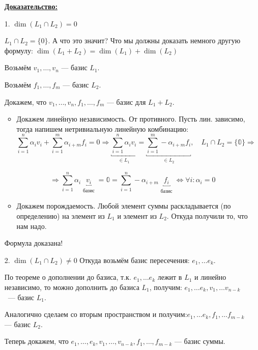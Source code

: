 \begin{enumerate}
    \item[]  \textbf{\uline{Доказательство:}}
    \item[1.] \(\dim (L_1 \cap L_2) = 0\)

          \(L_1 \cap L_2 = \{0\}\). А что это значит? Что мы должны доказать немного другую формулу: \(\dim (L_1 + L_2) = \dim (L_1) + \dim (L_2)\)

          Возьмём $v_1,\ldots, v_n$ ---   базис $L_1$.

          Возьмём $f_1,\ldots, f_m$ ---  базис $L_2$.

          Докажем, что $v_1,\ldots,v_n,f_1,\ldots,f_m$ --- базис для $L_1+ L_2$.


          \begin{itemize}
              \item Докажем линейную независимость. От противного. Пусть лин. зависимо, тогда напишем нетривиальную линейную комбинацию:
                    $$\sum\limits_{i=1}^n \alpha_i v_i + \sum\limits_{i=1}^m \alpha_{i+m} f_i =0 \Rightarrow \underbracket{{\sum\limits_{i=1}^n\alpha_iv_i}}_{\substack{\in L_1}} = \underbracket{{{\sum\limits_{i=1}^m} -\alpha_{i+m}f_i}}_{\substack{\in L_2}}, \quad L_1 \cap L_2 = \{\mathbb{0}\} \Rightarrow$$

                    $$\Rightarrow \sum_{i=1}^n \alpha_i \underbracket{v_i}_{\substack{\text{базис}}} = \mathbb{0} = \sum_{i=1}^n -\alpha_{i+m} \underbracket{f_i}_{\substack{\text{базис}}} \Leftrightarrow \forall i: \alpha_i = 0$$
              \item Докажем порождаемость. Любой элемент суммы раскладывается (по определению) на элемент из $L_1$ и элемент из $L_2$. Откуда получили то, что нам надо.
          \end{itemize}
          Формула доказана!

    \item[2.]  \(\dim (L_1 \cap L_2) \neq 0\)
          Откуда возьмём базис пересечения: \(e_1,\ldots e_k\).

          По теореме о дополнении до базиса, т.к. \(e_1,\ldots e_k\) лежит в $L_1$ и линейно независимо, то можно дополнить до базиса \(L_1\), получим: \(e_1,\ldots e_k, v_1, \ldots v_{n-k}\)~--- базис $L_1$.

          Аналогично сделаем со вторым пространством и получим:\(e_1,\ldots e_k, f_1, \ldots f_{m-k}\) --- базис $L_2$.

          Теперь докажем, что \(e_1,\ldots,e_k,v_1,\ldots,v_{n-k}, f_1, \ldots, f_{m-k}\) --- базис суммы.


\end{enumerate}

